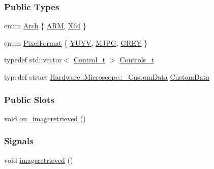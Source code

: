 \subsubsection*{Public Types}
\begin{DoxyCompactItemize}
\item 
enum \hyperlink{class_hardware_1_1_microscope_ae1afa6a1a1d5b560a5ad8f94c78a336b}{Arch} \{ \hyperlink{class_hardware_1_1_microscope_ae1afa6a1a1d5b560a5ad8f94c78a336ba6bdc0aef36aa37ed611a4630810e1228}{A\+R\+M}, 
\hyperlink{class_hardware_1_1_microscope_ae1afa6a1a1d5b560a5ad8f94c78a336baa3fff72b9355de46f67b5aec00640186}{X64}
 \}
\item 
enum \hyperlink{class_hardware_1_1_microscope_a1ca86e9e414d0497f2b2d88b258be1a7}{Pixel\+Format} \{ \hyperlink{class_hardware_1_1_microscope_a1ca86e9e414d0497f2b2d88b258be1a7ae4293cf0122f710943984fbffafde554}{Y\+U\+Y\+V}, 
\hyperlink{class_hardware_1_1_microscope_a1ca86e9e414d0497f2b2d88b258be1a7a65e77f52422117bd4aa6b9fc2026e8db}{M\+J\+P\+G}, 
\hyperlink{class_hardware_1_1_microscope_a1ca86e9e414d0497f2b2d88b258be1a7a7e8165097462456be1df041fd54fda5b}{G\+R\+E\+Y}
 \}
\item 
typedef std\+::vector$<$ \hyperlink{struct_hardware_1_1_microscope_1_1_control__t}{Control\+\_\+t} $>$ \hyperlink{class_hardware_1_1_microscope_a6e46a385288c3e0a8d9866fc8e147b09}{Controls\+\_\+t}
\item 
typedef struct \hyperlink{struct_hardware_1_1_microscope_1_1___custom_data}{Hardware\+::\+Microscope\+::\+\_\+\+Custom\+Data} \hyperlink{class_hardware_1_1_microscope_aba8ff1662f7d8a74e4aca943ccce7df4}{Custom\+Data}
\end{DoxyCompactItemize}
\subsubsection*{Public Slots}
\begin{DoxyCompactItemize}
\item 
void \hyperlink{class_hardware_1_1_microscope_a30346757ffd5d2f9d42b5a483842431e}{on\+\_\+imageretrieved} ()
\end{DoxyCompactItemize}
\subsubsection*{Signals}
\begin{DoxyCompactItemize}
\item 
void \hyperlink{class_hardware_1_1_microscope_a9ffc9b16e733b23c97d7dca4ef3210f5}{imageretrieved} ()
\end{DoxyCompactItemize}
